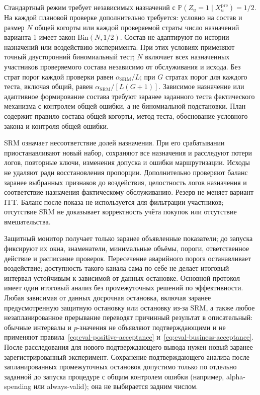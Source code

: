 \documentclass[12pt,a4paper]{article}
\newcommand{\Prob}{\mathbb P}
\theoremstyle{plainru}
\begin{document}
Стандартный режим требует независимых назначений с
$\Prob(Z_u=1\mid X_u^{\mathrm{pre}})=1/2$. На каждой плановой проверке
дополнительно требуется: условно на состав и размер $N$ общей когорты
или каждой проверяемой страты число назначений варианта 1 имеет закон
$\mathrm{Bin}(N,1/2)$. Состав не адаптируют по истории назначений
или воздействию эксперимента. При этих условиях применяют точный
двусторонний биномиальный тест; $N$ включает всех назначенных участников
проверяемого состава независимо от обслуживания и исхода.
Без страт порог каждой проверки равен $\alpha_{\mathrm{SRM}}/L$;
при $G$ стратах порог для каждого теста, включая общий, равен
$\alpha_{\mathrm{SRM}}/[L(G+1)]$. Зависимое назначение или адаптивное
формирование состава требуют заранее заданного теста фактического
механизма с контролем общей ошибки, а не биномиальной подстановки.
План содержит правило состава общей когорты, метод теста,
обоснование условного закона и контроля общей ошибки.

SRM означает несоответствие долей назначения. При его срабатывании
приостанавливают новый набор, сохраняют все назначения и расследуют
потери логов, повторные ключи, изменения допуска и ошибки маршрутизации.
Исходы не удаляют ради восстановления пропорции. Дополнительно проверяют
баланс заранее выбранных признаков до воздействия, целостность логов
назначения и соответствие назначения фактическому обслуживанию.
Резерв не меняет вариант ITT. Баланс после показа не используется
для фильтрации участников; отсутствие SRM не доказывает корректность
учёта покупок или отсутствие вмешательства.

Защитный монитор получает только заранее объявленные показатели;
до запуска фиксируют их окна, знаменатели, минимальные объёмы, пороги,
ответственное действие и расписание проверок. Пересечение аварийного
порога останавливает воздействие; доступность такого канала сама по себе
не делает итоговый интервал устойчивым к зависимой от данных остановке.
Основной протокол имеет один итоговый анализ без промежуточных решений
по эффективности. Любая зависимая от данных досрочная
остановка, включая заранее предусмотренную защитную остановку или остановку
из-за SRM, а также любое незапланированное прерывание переводят причинный результат
в описательный: обычные интервалы и $p$-значения не объявляют
подтверждающими и не применяют правила~\eqref{eq:eval-positive-acceptance}
и~\eqref{eq:eval-business-acceptance}. После расследования для нового
подтверждающего вывода нужен новый заранее зарегистрированный эксперимент.
Сохранение подтверждающего анализа после запланированных промежуточных
остановок допустимо только по отдельно заданной до запуска процедуре
с общим контролем ошибки (например, alpha-spending или always-valid);
она не выбирается задним числом.
\end{document}
